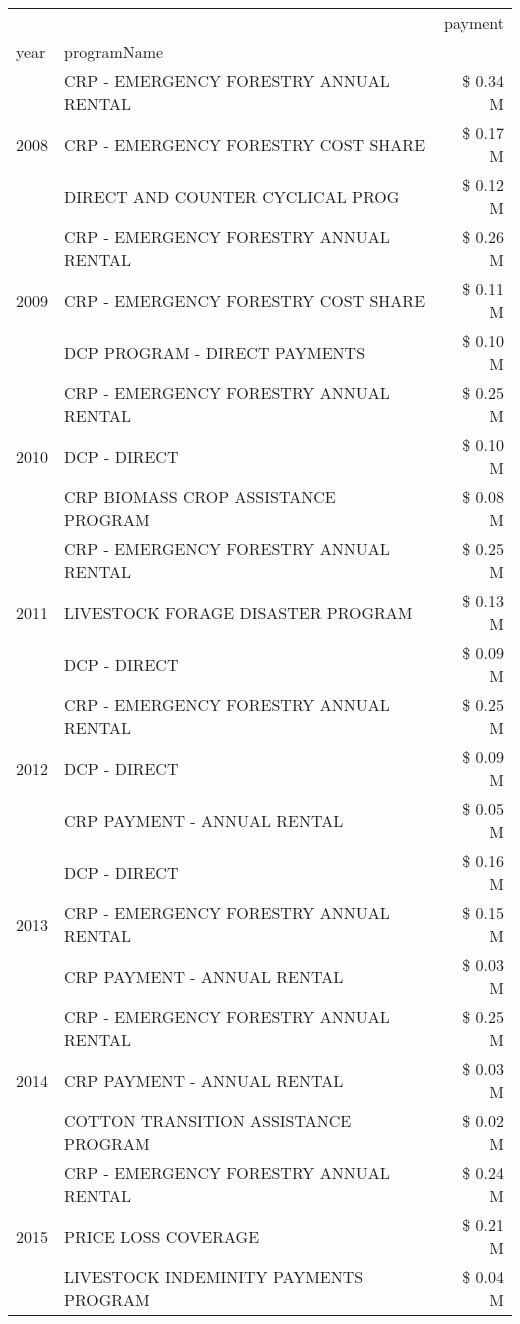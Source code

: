 \begin{tabular}{llr}
\toprule
 &  & payment \\
year & programName &  \\
\midrule
\multirow[t]{3}{*}{2008} & CRP - EMERGENCY FORESTRY ANNUAL RENTAL & \$ 0.34 M \\
 & CRP - EMERGENCY FORESTRY COST SHARE & \$ 0.17 M \\
 & DIRECT AND COUNTER CYCLICAL PROG & \$ 0.12 M \\
\cline{1-3}
\multirow[t]{3}{*}{2009} & CRP - EMERGENCY FORESTRY ANNUAL RENTAL & \$ 0.26 M \\
 & CRP - EMERGENCY FORESTRY COST SHARE & \$ 0.11 M \\
 & DCP PROGRAM - DIRECT PAYMENTS & \$ 0.10 M \\
\cline{1-3}
\multirow[t]{3}{*}{2010} & CRP - EMERGENCY FORESTRY ANNUAL RENTAL & \$ 0.25 M \\
 & DCP - DIRECT & \$ 0.10 M \\
 & CRP BIOMASS CROP ASSISTANCE PROGRAM & \$ 0.08 M \\
\cline{1-3}
\multirow[t]{3}{*}{2011} & CRP - EMERGENCY FORESTRY ANNUAL RENTAL & \$ 0.25 M \\
 & LIVESTOCK FORAGE DISASTER PROGRAM & \$ 0.13 M \\
 & DCP - DIRECT & \$ 0.09 M \\
\cline{1-3}
\multirow[t]{3}{*}{2012} & CRP - EMERGENCY FORESTRY ANNUAL RENTAL & \$ 0.25 M \\
 & DCP - DIRECT & \$ 0.09 M \\
 & CRP PAYMENT - ANNUAL RENTAL & \$ 0.05 M \\
\cline{1-3}
\multirow[t]{3}{*}{2013} & DCP - DIRECT & \$ 0.16 M \\
 & CRP - EMERGENCY FORESTRY ANNUAL RENTAL & \$ 0.15 M \\
 & CRP PAYMENT - ANNUAL RENTAL & \$ 0.03 M \\
\cline{1-3}
\multirow[t]{3}{*}{2014} & CRP - EMERGENCY FORESTRY ANNUAL RENTAL & \$ 0.25 M \\
 & CRP PAYMENT - ANNUAL RENTAL & \$ 0.03 M \\
 & COTTON TRANSITION ASSISTANCE PROGRAM & \$ 0.02 M \\
\cline{1-3}
\multirow[t]{3}{*}{2015} & CRP - EMERGENCY FORESTRY ANNUAL RENTAL & \$ 0.24 M \\
 & PRICE LOSS COVERAGE & \$ 0.21 M \\
 & LIVESTOCK INDEMINITY PAYMENTS PROGRAM & \$ 0.04 M \\

\end{tabular}
